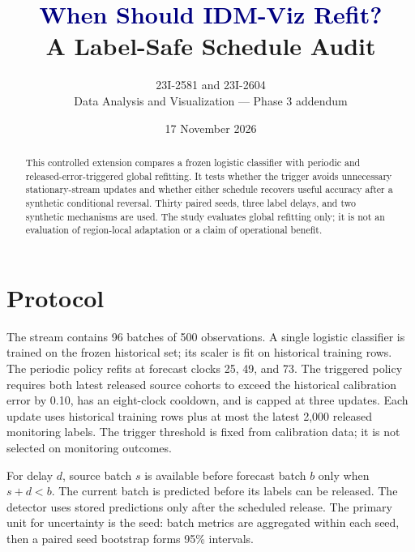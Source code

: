 \documentclass[10pt]{article}
\title{\textcolor{navy}{When Should IDM-Viz Refit?}\\[3pt]\large A Label-Safe Schedule Audit}
\author{23I-2581 and 23I-2604\\Data Analysis and Visualization --- Phase 3 addendum}
\date{17 November 2026}
\begin{document}
\maketitle
\begin{abstract}
This controlled extension compares a frozen logistic classifier with periodic and released-error-triggered global refitting. It tests whether the trigger avoids unnecessary stationary-stream updates and whether either schedule recovers useful accuracy after a synthetic conditional reversal. Thirty paired seeds, three label delays, and two synthetic mechanisms are used. The study evaluates global refitting only; it is not an evaluation of region-local adaptation or a claim of operational benefit.
\end{abstract}
\section{Protocol}
The stream contains 96 batches of 500 observations. A single logistic classifier is trained on the frozen historical set; its scaler is fit on historical training rows. The periodic policy refits at forecast clocks 25, 49, and 73. The triggered policy requires both latest released source cohorts to exceed the historical calibration error by 0.10, has an eight-clock cooldown, and is capped at three updates. Each update uses historical training rows plus at most the latest 2,000 released monitoring labels. The trigger threshold is fixed from calibration data; it is not selected on monitoring outcomes.

For delay $d$, source batch $s$ is available before forecast batch $b$ only when $s+d<b$. The current batch is predicted before its labels can be released. The detector uses stored predictions only after the scheduled release. The primary unit for uncertainty is the seed: batch metrics are aggregated within each seed, then a paired seed bootstrap forms 95\% intervals.
\end{document}
